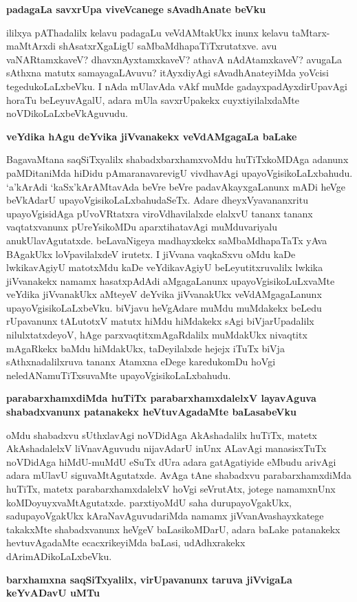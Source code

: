 {\bf padagaLa savxrUpa viveVcanege sAvadhAnate beVku}

ililxya pAThadalilx kelavu padagaLu veVdAMtakUkx inunx kelavu taMtarx-maMtArxdi shAsatxrXgaLigU saMbaMdhapaTiTxrutatxve. avu vaNARtamxkaveV? dhavxnAyxtamxkaveV? athavA nAdAtamxkaveV? avugaLa sAthxna matutx samayagaLAvuvu? itAyxdiyAgi sAvadhAnateyiMda yoVcisi tegedukoLaLxbeVku. I nAda mUlavAda vAkf muMde gadayxpadAyxdirUpavAgi horaTu beLeyuvAgalU, adara mUla savxrUpakekx cuyxtiyilalxdaMte noVDikoLaLxbeVkAguvudu.

{\bf veYdika hAgu deYvika jiVvanakekx veVdAMgagaLa baLake}

BagavaMtana saqSiTxyalilx shabadxbarxhamxvoMdu huTiTxkoMDAga adanunx paMDitaniMda hiDidu pAmaranavarevigU vivdhavAgi upayoVgisikoLaLxbahudu. `a'kArAdi `kaSx'kArAMtavAda beVre beVre padavAkayxgaLanunx mADi heVge beVkAdarU upayoVgisikoLaLxbahudaSeTx. Adare dheyxVyavananxritu upayoVgisidAga pUvoVRtatxra viroVdhavilalxde elalxvU tananx tananx vaqtatxvanunx pUreYsikoMDu aparxtihatavAgi muMduvariyalu anukUlavAgutatxde. beLavaNigeya madhayxkekx saMbaMdhapaTaTx yAva BAgakUkx loVpavilalxdeV irutetx. I jiVvana vaqkaSxvu oMdu kaDe lwkikavAgiyU matotxMdu kaDe veYdikavAgiyU beLeyutitxruvalilx lwkika jiVvanakekx namamx hasatxpAdAdi aMgagaLanunx upayoVgisikoLuLxvaMte veYdika jiVvanakUkx aMteyeV deYvika jiVvanakUkx veVdAMgagaLanunx upayoVgisikoLaLxbeVku. biVjavu heVgAdare muMdu muMdakekx beLedu rUpavanunx tALutotxV matutx hiMdu hiMdakekx sAgi biVjarUpadalilx nilulxtatxdeyoV, hAge parxvaqtitxmAgaRdalilx muMdakUkx nivaqtitx mAgaRkekx baMdu hiMdakUkx, taDeyilalxde hejejx iTuTx biVja sAthxnadalilxruva tananx Atamxna eDege karedukomDu hoVgi neledANamuTiTxsuvaMte upayoVgisikoLaLxbahudu.

{\bf parabarxhamxdiMda huTiTx parabarxhamxdalelxV layavAguva shabadxvanunx patanakekx heVtuvAgadaMte baLasabeVku}

oMdu shabadxvu sUthxlavAgi noVDidAga AkAshadalilx huTiTx, matetx AkAshadalelxV liVnavAguvudu nijavAdarU inUnx ALavAgi manasisxTuTx noVDidAga hiMdU-muMdU eSuTx dUra adara gatAgatiyide eMbudu arivAgi adara mUlavU siguvaMtAgutatxde. AvAga tAne shabadxvu parabarxhamxdiMda huTiTx, matetx parabarxhamxdalelxV hoVgi seVrutAtx, jotege namamxnUnx koMDoyuyxvaMtAgutatxde. parxtiyoMdU saha durupayoVgakUkx, sadupayoVgakUkx kAraNavAguvudariMda namamx jiVvanAvashayxkatege takakxMte shabadxvanunx heVgeV baLasikoMDarU, adara baLake patanakekx hevtuvAgadaMte ecacxrikeyiMda baLasi, udAdhxrakekx dArimADikoLaLxbeVku.

{\bf barxhamxna saqSiTxyalilx, virUpavanunx taruva jiVvigaLa keYvADavU uMTu}

